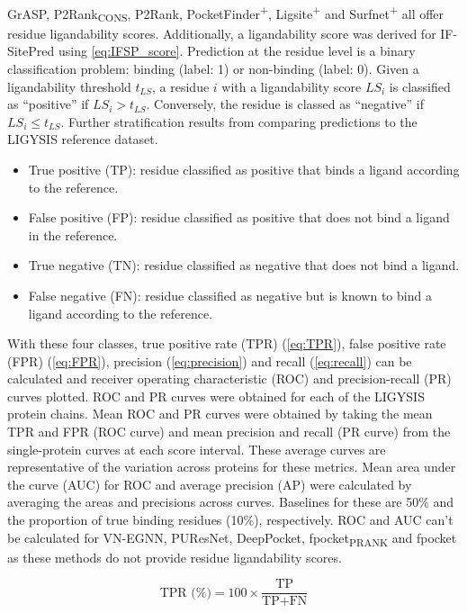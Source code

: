 GrASP, P2Rank\textsubscript{CONS}, P2Rank, PocketFinder\textsuperscript{+}, Ligsite\textsuperscript{+} and Surfnet\textsuperscript{+} all offer residue ligandability scores. Additionally, a ligandability score was derived for IF-SitePred using \autoref{eq:IFSP_score}. Prediction at the residue level is a binary classification problem: binding (label: 1) or non-binding (label: 0). Given a ligandability threshold $t_{LS}$, a residue $i$ with a ligandability score $LS_{i}$ is classified as ``positive'' if  $LS_{i} > t_{LS}$. Conversely, the residue is classed as ``negative'' if $LS_{i} \leq t_{LS}$. Further stratification results from comparing predictions to the LIGYSIS reference dataset.

\begin{itemize}
\item True positive (TP): residue classified as positive that binds a ligand according to the reference.
\item False positive (FP): residue classified as positive that does not bind a ligand in the reference.
\item True negative (TN): residue classified as negative that does not bind a ligand.
\item False negative (FN): residue classified as negative but is known to bind a ligand according to the reference.
\end{itemize}

With these four classes, true positive rate (TPR) (\autoref{eq:TPR}), false positive rate (FPR) (\autoref{eq:FPR}), precision (\autoref{eq:precision}) and recall (\autoref{eq:recall}) can be calculated and receiver operating characteristic (ROC) and precision-recall (PR) curves plotted. ROC and PR curves were obtained for each of the LIGYSIS protein chains. Mean ROC and PR curves were obtained by taking the mean TPR and FPR (ROC curve) and mean precision and recall (PR curve) from the single-protein curves at each score interval. These average curves are representative of the variation across proteins for these metrics. Mean area under the curve (AUC) for ROC and average precision (AP) were calculated by averaging the areas and precisions across curves. Baselines for these are 50\% and the proportion of true binding residues (10\%), respectively. ROC and AUC can't be calculated for VN-EGNN, PUResNet, DeepPocket, fpocket\textsubscript{PRANK} and fpocket as these methods do not provide residue ligandability scores.

\begin{equation}
\text{TPR (\%)} = 100 \times \frac{\text{TP}}{\text{TP} + \text{FN}}
\label{eq:TPR}
\end{equation}

